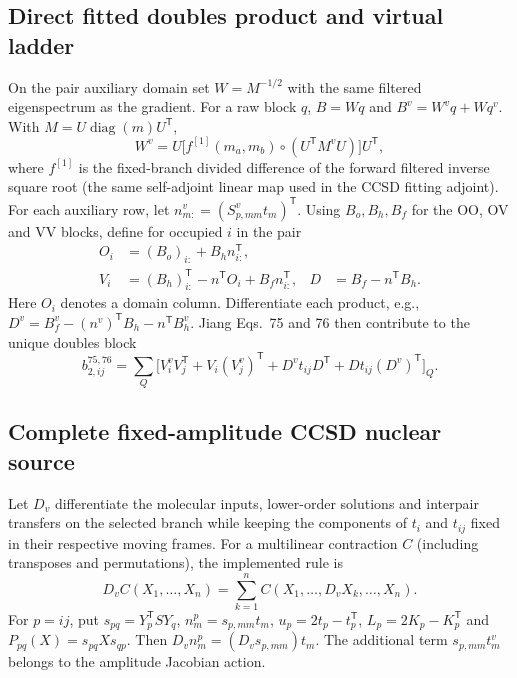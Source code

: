 \documentclass[11pt]{article}
\begin{document}
\subsection{Direct fitted doubles product and virtual ladder}
On the pair auxiliary domain set $W=M^{-1/2}$ with the same filtered
eigenspectrum as the gradient. For a raw block $q$, $B=Wq$ and
$B^v=W^v q+W q^v$. With $M=U\operatorname{diag}(m)U^{\mathsf T}$,
\begin{equation}
 W^v=U\big[f^{[1]}(m_a,m_b)\circ(U^{\mathsf T}M^v U)\big]U^{\mathsf T},
\end{equation}
where $f^{[1]}$ is the fixed-branch divided difference of the forward
filtered inverse square root (the same self-adjoint linear map used in the
CCSD fitting adjoint). For each auxiliary row, let
$n^v_{m:}=(S^v_{p,mm}t_m)^{\mathsf T}$. Using $B_o,B_h,B_f$ for the
OO, OV and VV blocks, define for occupied $i$ in the pair
\begin{align}
 O_i &= (B_o)_{i:}+B_h n_{i:}^{\mathsf T},\\
 V_i &= (B_h)_{i:}^{\mathsf T}-n^{\mathsf T}O_i+B_f n_{i:}^{\mathsf T},
 & D &= B_f-n^{\mathsf T}B_h .
\end{align}
Here $O_i$ denotes a domain column. Differentiate each product, e.g.,
$D^v=B_f^v-(n^v)^{\mathsf T}B_h-n^{\mathsf T}B_h^v$.
Jiang Eqs.~75 and 76 then contribute to the unique doubles block
\begin{equation}
 b_{2,ij}^{75,76}=\sum_Q\big[
 V_i^v V_j^{\mathsf T}+ V_i(V_j^v)^{\mathsf T}
 + D^v t_{ij}D^{\mathsf T}+D t_{ij}(D^v)^{\mathsf T}\big]_Q .
\end{equation}
\subsection{Complete fixed-amplitude CCSD nuclear source}
Let $D_v$ differentiate the molecular inputs, lower-order solutions and
interpair transfers on the selected branch while keeping the components of
$t_i$ and $t_{ij}$ fixed in their respective moving frames. For a multilinear
contraction $C$ (including transposes and permutations), the implemented rule is
\begin{equation}
 D_v C(X_1,\ldots,X_n)=\sum_{k=1}^n
 C(X_1,\ldots,D_v X_k,\ldots,X_n).
\end{equation}
For $p=ij$, put $s_{pq}=Y_p^{\mathsf T} S Y_q$, $n_m^p=s_{p,mm}t_m$,
$u_p=2t_p-t_p^{\mathsf T}$, $L_p=2K_p-K_p^{\mathsf T}$ and
$P_{pq}(X)=s_{pq}Xs_{qp}$.
Then $D_v n_m^p=(D_v s_{p,mm})t_m$.
The additional term $s_{p,mm}t_m^v$ belongs to the amplitude Jacobian action.
\end{document}
